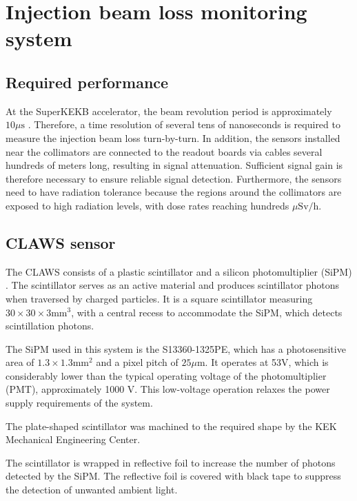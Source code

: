 \chapter{Injection beam loss monitoring system}\label{sec:Injection bea loss monitoring system}

\section{Required performance}

At the SuperKEKB accelerator, the beam revolution period is approximately $10 \mu\mathrm{s}$ . Therefore, a time resolution of several tens of nanoseconds is required to measure the injection beam loss turn-by-turn. In addition, the sensors installed near the collimators are connected to the readout boards via cables several hundreds of meters long, resulting in signal attenuation. Sufficient signal gain is therefore necessary to ensure reliable signal detection. Furthermore, the sensors need to have radiation tolerance because the regions around the collimators are exposed to high radiation levels, with dose rates reaching hundreds $\mu\mathrm{Sv}\mathrm{/h}$. 


\section{CLAWS sensor}
The CLAWS consists of a plastic scintillator and a silicon photomultiplier (SiPM) \cite{Windel:2021zqa}. The scintillator serves as an active material and produces scintillator photons when traversed by charged particles. It is a square scintillator measuring $30 \times30 \times 3\mathrm{mm}^3$, with a central recess to accommodate the SiPM, which detects scintillation photons. 

The SiPM used in this system is the S13360-1325PE, which has a photosensitive area of $1.3 \times 1.3 \mathrm{mm}^2$ and a pixel pitch of $25\mu\mathrm{m}$. It operates at 53V, which is considerably lower than the typical operating voltage of the photomultiplier (PMT), approximately 1000 V. This low-voltage operation relaxes the power supply requirements of the system.

The plate-shaped scintillator \cite{scintillator} was machined to the required shape by the KEK Mechanical Engineering Center. 

The scintillator is wrapped in reflective foil to increase the number of photons detected by the SiPM. The reflective foil is covered with black tape to suppress the detection of unwanted ambient light.

